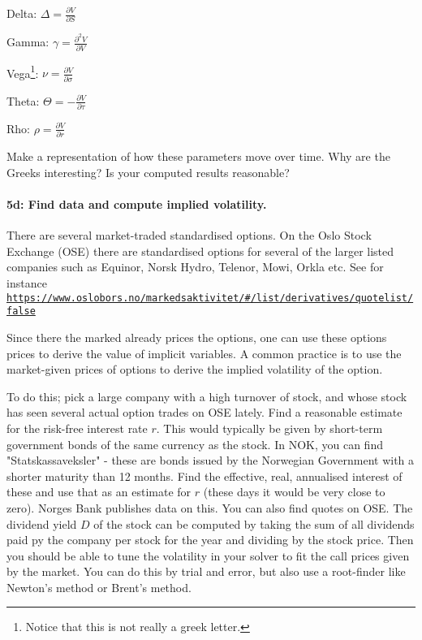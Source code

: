 \documentclass[%
oneside,                 %
final,                   %
10pt]{article}
\begin{document}
Delta: $\Delta = \frac{\partial V}{\partial S}$

Gamma: $\gamma = \frac{\partial^2 V}{\partial V}$

Vega\footnote{Notice that this is not really a greek letter.}: $\nu = \frac{\partial V}{\partial \sigma}$



Theta: $\Theta = -\frac{\partial V}{\partial \tau}$

Rho: $\rho = \frac{\partial V}{\partial r}$

Make a representation of how these parameters move over time.
Why are the Greeks interesting? Is your computed results reasonable?


\paragraph{5d: Find data and compute implied volatility.}
There are several market-traded standardised options. On the 
Oslo Stock Exchange (OSE) there are standardised options for several 
of the larger listed companies such as Equinor, Norsk Hydro,
Telenor, Mowi, Orkla etc. See for instance
\href{{https://www.oslobors.no/markedsaktivitet/#/list/derivatives/quotelist/false}}{\nolinkurl{https://www.oslobors.no/markedsaktivitet/\#/list/derivatives/quotelist/false}}

Since there the marked already prices the options, one can use these options 
prices to derive the value of implicit variables. A common practice 
is to use the market-given prices of options to derive the 
implied volatility of the option. 

To do this; pick a large company with a high turnover of stock,
and whose stock has seen several actual option trades on OSE lately.
Find a reasonable estimate for the risk-free interest rate $r$. This would 
typically be given by short-term government bonds of the same currency as 
the stock. In NOK, you can find "Statskassaveksler" - these are bonds issued 
by the Norwegian Government with a shorter maturity than 12 months.
Find the effective, real, annualised interest of these and use that as an 
estimate for $r$ (these days it would be very close to zero). Norges 
Bank publishes data on this. You can also find quotes on OSE.
The dividend yield $D$ of the stock can be computed by taking the sum 
of all dividends paid py the company per stock for the year and dividing
by the stock 
price. Then you should be able to tune the volatility in your solver to 
fit the call prices given by the market. You can do this by trial and 
error, but also use a root-finder like Newton's method or Brent's 
method.
\end{document}
